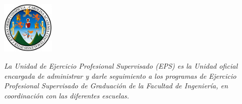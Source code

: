\documentclass[11pt,spanish,Letterpaper,openany]{book}
\begin{document}
\begin {flushleft}

\begin{tcolorbox}[sharp corners=uphill, colback=fondo, colframe=fondo, arc=6mm, boxrule=0mm, boxsep=2mm,  opacityframe=0.19,  opacityback=0.19]

\begin{minipage}[c]{3cm}

\includegraphics[width=2.5cm,height=\textheight]{images/201901-usac-logo.jpg}

\end{minipage}\begin{minipage}[c]{12cm}

\emph{La Unidad de Ejercicio Profesional Supervisado (EPS) es la Unidad oficial encargada de administrar y darle seguimiento a los programas de Ejercicio Profesional Supervisado de Graduación de la Facultad de Ingeniería, en coordinación con las diferentes escuelas.}

\end{minipage}

\end {tcolorbox}

\end {flushleft}
\smallskip
\end{document}
